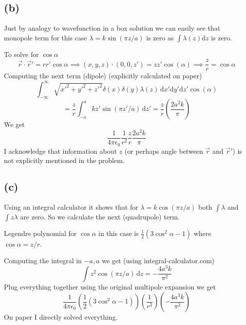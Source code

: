 \documentclass[letter, 10pts]{article}
\begin{document}
\subsection*{(b)} 
Just by analogy to wavefunction in a box solution we can easily see that monopole term for this case $\lambda = k \sin ( \pi  z / a)$ is zero as $ \int \lambda(z) \mathrm{d} z$ is zero. 

To solve for $\cos \alpha$ 
\[
\vec{r} \cdot  \vec{r}' = r r' \cos \alpha \implies (x,y,z)\cdot (0,0,z') = z z' \cos (\alpha) \implies \frac{z}{r} = \cos \alpha 
\] 
Computing the next term (dipole) (explicitly calculated on paper)
\[
\int_{-\infty}^{\infty} 
\sqrt{x'^2 + y'^2 + z'^2} \delta(x) \delta(y) \lambda(z) \, \mathrm{d} x' \mathrm{d} y' \mathrm{d} z'
\cos (\alpha)
\] 
\[ = 
\frac{z}{r} \int_{-a}^{a} k z' \sin ( \pi z' / a  ) \, \mathrm{d} z' = \frac{z}{r} \left(\frac{2 a^2 k}{\pi  }\right)
\] 
We get
\[
\boxed{
\frac{1}{4 \pi \epsilon_0} \frac{1}{r^2} \frac{z}{r} \frac{2 a^2 k }{\pi }
}
\] 
I acknowledge that information about $z$ (or perhaps angle between $\vec{r}$ and $\vec{r}'$) is not explicitly mentioned in the problem. 

\subsection*{(c)} 
Using an integral calculator it shows that for $\lambda = k \cos(\pi z / a)$ both $\int \lambda $ and $\int z \lambda$ are zero. So we calculate the next (quadrupole) term. 

Legendre polynomial for $\cos \alpha$ in this case is $\frac{1}{2} (3 \cos ^2 \alpha - 1)$ where $\cos \alpha = z / r$.

Computing the integral in $-a, a$ we get (using integral-calculator.com)
\[
\int z^2 \cos( \pi z / a) \, \mathrm{d} z = - \frac{4 a^3 k }{\pi ^2}
\] 
Plug everything together using the original multipole expansion we get
\[
\boxed{
\frac{1}{4 \pi \epsilon_0} \left(\frac{1}{2} (3 \cos ^2 \alpha - 1) \right) \left(\frac{1}{r^3}\right) \left(- \frac{4 a^3k }{\pi ^2}\right)
}
\] 
On paper I directly solved everything. 
\end{document}
